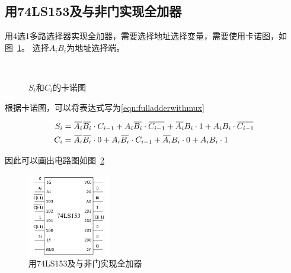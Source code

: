 \documentclass[a4paper,twoside]{ctexart}
\newcommand{\ols}[1]{\mskip.5\thinmuskip\overline{\mskip-.5\thinmuskip {#1} \mskip-.5\thinmuskip}\mskip.5\thinmuskip}
\begin{document}
\begin{spacing}{1.2}
\subsection{用74LS153及与非门实现全加器}

用4选1多路选择器实现全加器，需要选择地址选择变量，需要使用卡诺图，如图~\ref{eqn:knm}。
选择$A_i B_i$为地址选择端。

\begin{figure}[htbp]
	\centering
	\caption{$S_i$和$C_i$的卡诺图}
	\label{eqn:knm}
	~
\end{figure}

根据卡诺图，可以将表达式写为\eqref{eqn:fulladderwithmux}

\begin{equation}
	\label{eqn:fulladderwithmux}
	\begin{aligned}
		S_i&=\ols{A_i}\ols{B_i} \cdot C_{i-1}+ A_i\ols{B_i}\cdot \ols{C_{i-1}}+ \ols{A_i}B_i\cdot 1+A_iB_i\cdot \ols{C_{i-1}}\\
		C_i&=\ols{A_i}\ols{B_i} \cdot 0+ A_i\ols{B_i}\cdot C_{i-1}+ \ols{A_i}B_i\cdot 0+A_iB_i\cdot 1\\
	\end{aligned}
\end{equation}

因此可以画出电路图如图~\ref{fig:fulladder153}

\begin{figure}[htbp]
	\centering
	\caption{用74LS153及与非门实现全加器}
	\label{fig:fulladder153}
	\includegraphics[width=0.32\textwidth]{images/43.png}
\end{figure}


\end{spacing}
\end{document}
